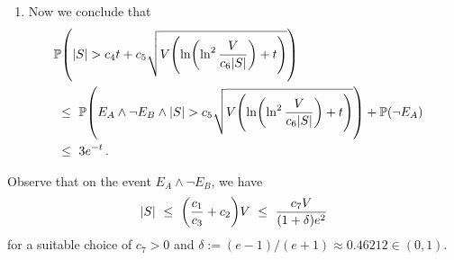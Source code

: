 \documentclass[11pt]{article}
\renewcommand{\P}{\ensuremath{\mathbb{P}}}
\theoremstyle{remark}
\theoremstyle{definition}
\newcommand\Parens[1]{\mleft(#1\mright)}
\begin{document}
\begin{enumerate}
  \item
    Now we conclude that
    \begin{align*}
      \lefteqn{
        \P\Parens{
          |S| >
          c_4 t +
          c_5 \sqrt{
            V \Parens{
              \ln\Parens{
                \ln^2\frac{V}{c_6|S|}
              } + t
            }
          }
        }
      } \\
      & \ \leq \
      \P\Parens{
        E_A \wedge
        \neg E_B \wedge
        |S| >
        c_5 \sqrt{
          V \Parens{
            \ln\Parens{
              \ln^2\frac{V}{c_6|S|}
            } + t
          }
        }
      }
      + \P(\neg E_A)
      \\
      & \ \leq \
      3e^{-t}
      \,.
    \end{align*}

\end{enumerate}

Observe that on the event $E_A \wedge \neg E_B$, we have
\[
  |S|
  \ \leq \
  \Parens{
    \frac{c_1}{c_3} + c_2
  } V
  \ \leq \
  \frac{c_7V}{(1+\delta)e^2}
\]
for a suitable choice of $c_7>0$ and $\delta := (e-1)/(e+1) \approx
0.46212 \in (0,1)$.
\end{document}
